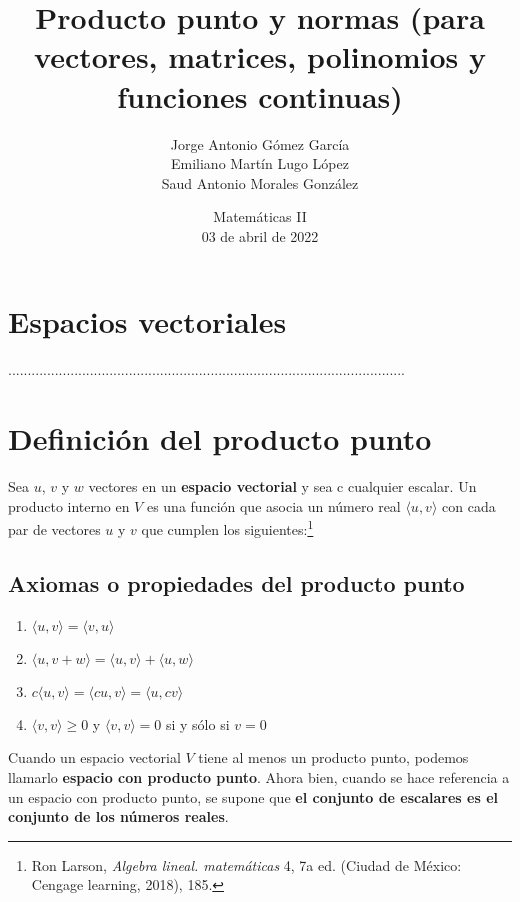 \documentclass{article}
\title{Producto punto y normas (para vectores, matrices, polinomios y funciones continuas)}
\author{
    Jorge Antonio Gómez García \\
    Emiliano Martín Lugo López \\
    Saud Antonio Morales González
}
\date{Matemáticas II\\03 de abril de 2022}
\begin{document}
\maketitle

    \section{Espacios vectoriales}

         ......................................................................................................

    \section{Definición del producto punto}

        Sea $u$, $v$ y $w$ vectores en un \textbf{espacio vectorial} y sea c cualquier escalar. Un producto interno en $V$ es una función que asocia un número real $\langle u, v\rangle$ con cada par de vectores $u$ y $v$ que cumplen los siguientes:\footnote{Ron Larson, \textit{Algebra lineal. matemáticas} 4, 7a ed. (Ciudad de México: Cengage learning, 2018), 185.}

        \subsection{Axiomas o propiedades del producto punto}

        \begin{enumerate}

            \item $\langle u, v\rangle = \langle v, u\rangle$
            \item $\langle u, v + w\rangle = \langle u, v\rangle + \langle u, w\rangle$
            \item $c\langle u, v\rangle=\langle c u, v\rangle=\langle u, c v\rangle$
            \item $\langle v, v\rangle \geq 0$ y $\langle v, v\rangle = 0$ si y sólo si $v = 0$

        \end{enumerate}

        Cuando un espacio vectorial $V$ tiene al menos un producto punto, podemos llamarlo \textbf{espacio con producto punto}. Ahora bien, cuando se hace referencia a un espacio con producto punto, se supone que \textbf{el conjunto de escalares es el conjunto de los números reales}.

\end{document}
